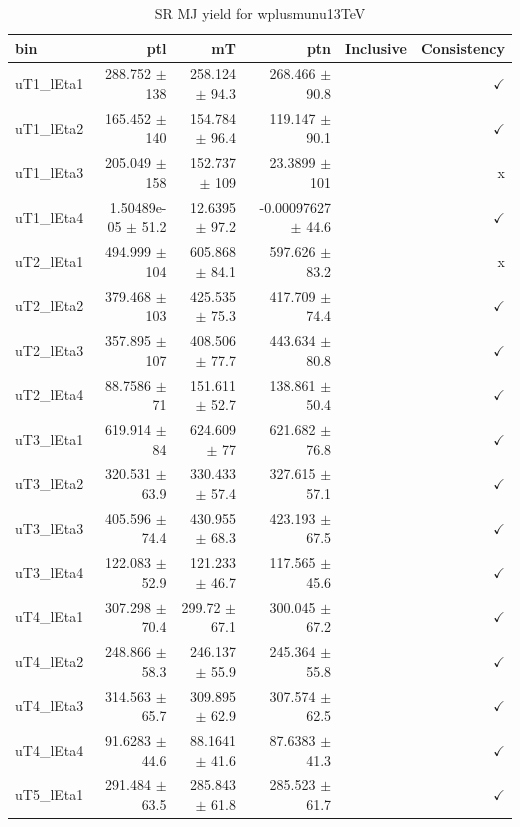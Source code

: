 \begin{table}[htbp]
\centering
\scriptsize
\caption{SR MJ yield for wplusmunu13TeV}
\label{tab:wplusmunu13TeV}
\setlength{\tabcolsep}{6pt}
\begin{tabular}{lrrrrr}
\hline
bin & ptl & mT & ptn & Inclusive & Consistency \\
\hline
uT1\_lEta1 & 288.752 $\pm$ 138 & 258.124 $\pm$ 94.3 & 268.466 $\pm$ 90.8 &  & $\checkmark$ \\
uT1\_lEta2 & 165.452 $\pm$ 140 & 154.784 $\pm$ 96.4 & 119.147 $\pm$ 90.1 &  & $\checkmark$ \\
uT1\_lEta3 & 205.049 $\pm$ 158 & 152.737 $\pm$ 109 & 23.3899 $\pm$ 101 &  & x \\
uT1\_lEta4 & 1.50489e-05 $\pm$ 51.2 & 12.6395 $\pm$ 97.2 & -0.00097627 $\pm$ 44.6 &  & $\checkmark$ \\
uT2\_lEta1 & 494.999 $\pm$ 104 & 605.868 $\pm$ 84.1 & 597.626 $\pm$ 83.2 &  & x \\
uT2\_lEta2 & 379.468 $\pm$ 103 & 425.535 $\pm$ 75.3 & 417.709 $\pm$ 74.4 &  & $\checkmark$ \\
uT2\_lEta3 & 357.895 $\pm$ 107 & 408.506 $\pm$ 77.7 & 443.634 $\pm$ 80.8 &  & $\checkmark$ \\
uT2\_lEta4 & 88.7586 $\pm$ 71 & 151.611 $\pm$ 52.7 & 138.861 $\pm$ 50.4 &  & $\checkmark$ \\
uT3\_lEta1 & 619.914 $\pm$ 84 & 624.609 $\pm$ 77 & 621.682 $\pm$ 76.8 &  & $\checkmark$ \\
uT3\_lEta2 & 320.531 $\pm$ 63.9 & 330.433 $\pm$ 57.4 & 327.615 $\pm$ 57.1 &  & $\checkmark$ \\
uT3\_lEta3 & 405.596 $\pm$ 74.4 & 430.955 $\pm$ 68.3 & 423.193 $\pm$ 67.5 &  & $\checkmark$ \\
uT3\_lEta4 & 122.083 $\pm$ 52.9 & 121.233 $\pm$ 46.7 & 117.565 $\pm$ 45.6 &  & $\checkmark$ \\
uT4\_lEta1 & 307.298 $\pm$ 70.4 & 299.72 $\pm$ 67.1 & 300.045 $\pm$ 67.2 &  & $\checkmark$ \\
uT4\_lEta2 & 248.866 $\pm$ 58.3 & 246.137 $\pm$ 55.9 & 245.364 $\pm$ 55.8 &  & $\checkmark$ \\
uT4\_lEta3 & 314.563 $\pm$ 65.7 & 309.895 $\pm$ 62.9 & 307.574 $\pm$ 62.5 &  & $\checkmark$ \\
uT4\_lEta4 & 91.6283 $\pm$ 44.6 & 88.1641 $\pm$ 41.6 & 87.6383 $\pm$ 41.3 &  & $\checkmark$ \\
uT5\_lEta1 & 291.484 $\pm$ 63.5 & 285.843 $\pm$ 61.8 & 285.523 $\pm$ 61.7 &  & $\checkmark$ \\

\end{tabular}
\end{table}
